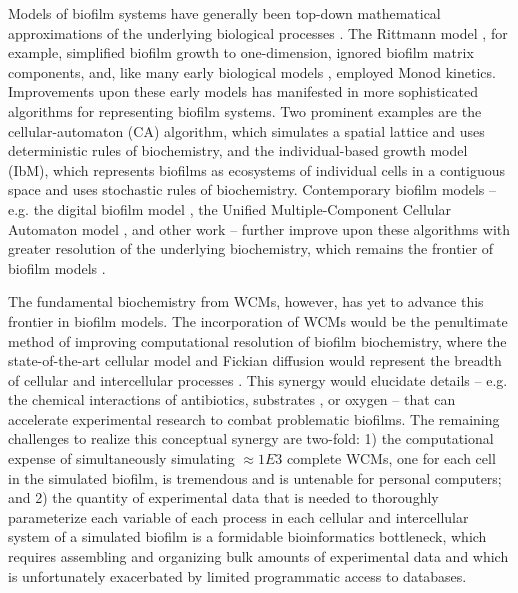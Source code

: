 Models of biofilm systems have generally been top-down mathematical approximations of the underlying biological processes \cite{Wang2010ReviewBiofilms,Lewandowski20114.15Treatment,Wanner1986AModel,Tiwari2001ModelingApplications,Tiwari1997BiofilmMedium}. The Rittmann model \cite{Suidan1987CriteriaTypes}, for example, simplified biofilm growth to one-dimension, ignored biofilm matrix components, and, like many early biological models \cite{Kim1989ApproximateExpression,Torres2008KineticAnode}, employed Monod kinetics. Improvements upon these early models \cite{Wanner1984CompetitionBiofilms,Gadani1993AModel} has manifested in more sophisticated algorithms for representing biofilm systems. Two prominent examples are the cellular-automaton (CA) algorithm, which simulates a spatial lattice and uses deterministic rules of biochemistry, and the individual-based growth model (IbM), which represents biofilms as ecosystems of individual cells in a contiguous space \cite{Kreft1998BacSimGrowth} and uses stochastic rules of biochemistry. Contemporary biofilm models \cite{Xavier2005Biofilm-controlStudy,DeJong2017MathematicalGrowth} -- e.g. the digital biofilm model \cite{Barai2016ModelingBehavior}, the Unified Multiple-Component Cellular Automaton model \cite{Laspidou2004EvaluatingModel}, and other work \cite{Laspidou2014MaterialProperties,Laspidou2005FiniteBehavior} -- further improve upon these algorithms with greater resolution of the underlying biochemistry, which remains the frontier of biofilm models \cite{Laspidou2010Cellular-automataCons}.

The fundamental biochemistry from WCMs, however, has yet to advance this frontier in biofilm models. The incorporation of WCMs would be the penultimate method of improving computational resolution of biofilm biochemistry, where the state-of-the-art cellular model and Fickian diffusion \cite{Das1991AEquation} would represent the breadth of cellular and intercellular processes \cite{Frederick2011ACommunities,Characklis1981MicrobialAnalysis.}. This synergy would elucidate details -- e.g. the chemical interactions of antibiotics, substrates \cite{Suidan1987CriteriaTypes}, or oxygen \cite{Lewandowski1991ReactionBiofilms} -- that can accelerate experimental research to combat problematic biofilms. The remaining challenges to realize this conceptual synergy are two-fold: 1) the computational expense of simultaneously simulating $\approx 1E3$ complete WCMs, one for each cell in the simulated biofilm, is tremendous and is untenable for personal computers; and 2) the quantity of experimental data that is needed to thoroughly parameterize each variable of each process in each cellular and intercellular system of a simulated biofilm is a formidable bioinformatics bottleneck, which requires assembling and organizing bulk amounts of experimental data and which is unfortunately exacerbated by limited programmatic access to databases. 

